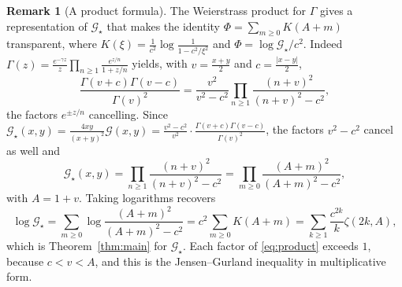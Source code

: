 \documentclass[11pt,a4paper]{amsart}
\theoremstyle{definition}
\newtheorem{remark}[theorem]{Remark}
\newcommand{\Gg}{\mathcal{G}}
\newcommand{\Gs}{\mathcal{G}_{\star}}
\begin{document}
\begin{remark}[A product formula]\label{rem:product}
The Weierstrass product for $\Gamma$ gives a representation of $\Gs$ that makes the
identity $\Phi=\sum_{m\ge0}K(A+m)$ transparent, where
$K(\xi)=\frac{1}{c^{2}}\log\frac{1}{1-c^{2}/\xi^{2}}$ and $\Phi=\log\Gs/c^{2}$. Indeed
$\Gamma(z)=\frac{e^{-\gamma z}}{z}\prod_{n\ge1}\frac{e^{z/n}}{1+z/n}$ yields, with
$v=\frac{x+y}{2}$ and $c=\frac{|x-y|}{2}$,
\[
  \frac{\Gamma(v+c)\Gamma(v-c)}{\Gamma(v)^{2}}
   =\frac{v^{2}}{v^{2}-c^{2}}\prod_{n\ge1}\frac{(n+v)^{2}}{(n+v)^{2}-c^{2}} ,
\]
the factors $e^{\pm z/n}$ cancelling. Since
$\Gs(x,y)=\frac{4xy}{(x+y)^{2}}\Gg(x,y)=\frac{v^{2}-c^{2}}{v^{2}}\cdot
 \frac{\Gamma(v+c)\Gamma(v-c)}{\Gamma(v)^{2}}$, the factors $v^{2}-c^{2}$ cancel as well
and
\begin{equation}\label{eq:product}
  \Gs(x,y)=\prod_{n\ge1}\frac{(n+v)^{2}}{(n+v)^{2}-c^{2}}
          =\prod_{m\ge0}\frac{(A+m)^{2}}{(A+m)^{2}-c^{2}} ,
\end{equation}
with $A=1+v$. Taking logarithms recovers
\[
  \log\Gs=\sum_{m\ge0}\log\frac{(A+m)^{2}}{(A+m)^{2}-c^{2}}
  =c^{2}\sum_{m\ge0}K(A+m)
  =\sum_{k\ge1}\frac{c^{2k}}{k}\zeta(2k,A),
\]
which is Theorem~\ref{thm:main} for $\Gs$. Each factor of \eqref{eq:product} exceeds $1$,
because $c<v<A$, and this is the Jensen--Gurland inequality in multiplicative form.
\end{remark}
\end{document}
